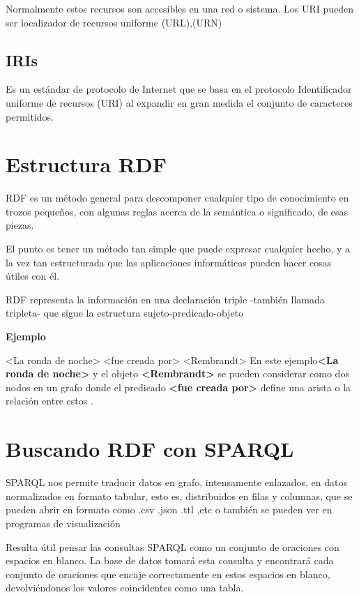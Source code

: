 \documentclass[conference]{IEEEtran}
\begin{document}
Normalmente estos recursos son accesibles en una red o sistema. Los URI pueden ser localizador de recursos uniforme (URL),(URN)
\subsection{IRIs}
Es un estándar de protocolo de Internet que se basa en el protocolo Identificador uniforme de recursos (URI) al expandir en gran medida el conjunto de caracteres permitidos.

\section{Estructura RDF}
RDF es un método general para descomponer cualquier tipo de conocimiento en trozos pequeños, con algunas reglas acerca de la semántica o significado, de esas piezas.

El punto es tener un método tan simple que puede expresar cualquier hecho, y a la vez tan estructurada que las aplicaciones informáticas pueden hacer cosas útiles con él.  \cite{b5}

RDF representa la información en una declaración triple -también llamada tripleta- que sigue la estructura sujeto-predicado-objeto \cite{b5}

\vspace{0.2cm}
\textbf{Ejemplo}

<La ronda de noche> <fue creada por> <Rembrandt>
\vspace{0.2cm}
En este ejemplo\textbf{<La ronda de noche>} y el objeto \textbf{<Rembrandt>} se pueden considerar como dos nodos en un grafo donde el predicado \textbf{<fue creada por>} define una arista o la relación entre estos . \cite{b5}

\vspace{0.2cm}


\section{Buscando RDF con SPARQL}
SPARQL nos permite traducir datos en grafo, intensamente enlazados, en datos normalizados en formato tabular, esto es, distribuidos en filas y columnas, que se pueden abrir  en formato como .csv .json .ttl ,etc o también se pueden ver en programas de visualización


Resulta útil pensar las consultas SPARQL como un conjunto de oraciones con espacios en blanco. La base de datos tomará esta consulta y encontrará cada conjunto de oraciones que encaje correctamente en estos espacios en blanco, devolviéndonos los valores coincidentes como una tabla.
\vspace{0.2cm}
\end{document}
